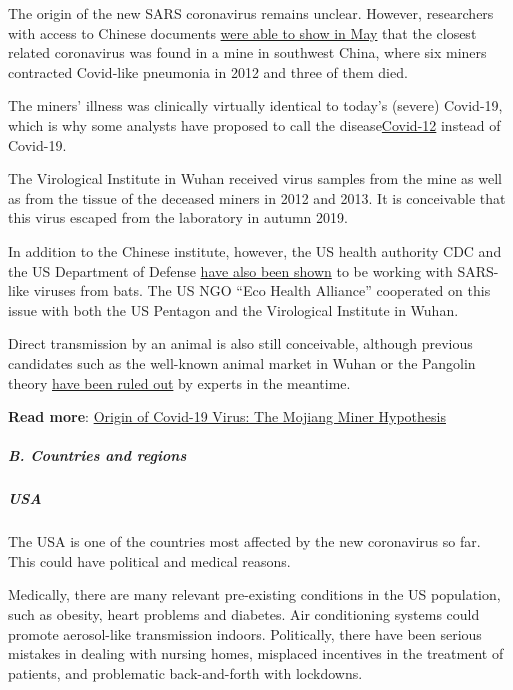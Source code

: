 The origin of the new SARS coronavirus remains unclear. However,
researchers with access to Chinese documents
\href{https://swprs.org/covid-19-virus-origin-the-mojiang-miners-passage-hypothesis/}{were
able to show in May} that the closest related coronavirus was found in a
mine in southwest China, where six miners contracted Covid-like
pneumonia in 2012 and three of them died.

The miners' illness was clinically virtually identical to today's
(severe) Covid-19, which is why some analysts have proposed to call the
disease\href{https://twitter.com/search?q=\%23covid12\&f=live}{Covid-12}
instead of Covid-19.

The Virological Institute in Wuhan received virus samples from the mine
as well as from the tissue of the deceased miners in 2012 and 2013. It
is conceivable that this virus escaped from the laboratory in autumn
2019.

In addition to the Chinese institute, however, the US health authority
CDC and the US Department of Defense
\href{https://armswatch.com/project-g-2101-pentagon-biolab-discovered-mers-and-sars-like-coronaviruses-in-bats/}{have
also been shown} to be working with SARS-like viruses from bats. The US
NGO ``Eco Health Alliance'' cooperated on this issue with both the US
Pentagon and the Virological Institute in Wuhan.

Direct transmission by an animal is also still conceivable, although
previous candidates such as the well-known animal market in Wuhan or the
Pangolin theory
\href{https://www.news-medical.net/news/20200708/Research-sheds-doubt-on-the-Pangolin-link-to-SARS-CoV-2.aspx}{have
been ruled out} by experts in the meantime.

\textbf{Read more}:
\href{https://swprs.org/covid-19-virus-origin-the-mojiang-miners-passage-hypothesis/}{Origin
of Covid-19 Virus: The Mojiang Miner Hypothesis}

\hypertarget{b-countries-and-regions}{%
\subparagraph{\texorpdfstring{\textbf{B. Countries and
regions}}{B. Countries and regions}}\label{b-countries-and-regions}}

\hypertarget{usa}{%
\subparagraph{\texorpdfstring{\textbf{USA}}{USA}}\label{usa}}

The USA is one of the countries most affected by the new coronavirus so
far. This could have political and medical reasons.

Medically, there are many relevant pre-existing conditions in the US
population, such as obesity, heart problems and diabetes. Air
conditioning systems could promote aerosol-like transmission indoors.
Politically, there have been serious mistakes in dealing with nursing
homes, misplaced incentives in the treatment of patients, and
problematic back-and-forth with lockdowns.

